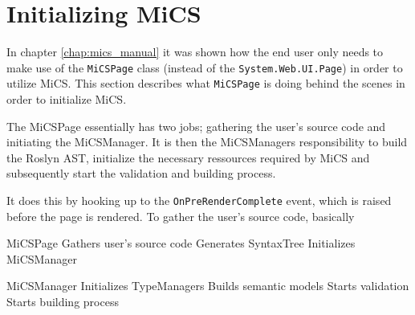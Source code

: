 \section{Initializing MiCS} %
\label{sec:initializing_mics}

In chapter \ref{chap:mics_manual} it was shown how the end user only needs to make use of the \texttt{MiCSPage} class (instead of the \texttt{System.Web.UI.Page}) in order to utilize MiCS. This section describes what \texttt{MiCSPage} is doing behind the scenes in order to initialize MiCS.

The MiCSPage essentially has two jobs; gathering the user's source code and initiating the MiCSManager. It is then the MiCSManagers responsibility to build the Roslyn AST, initialize the necessary ressources required by MiCS and subsequently start the validation and building process.

It does this by hooking up to the \texttt{OnPreRenderComplete} event, which is raised before the page is rendered. To gather the user's source code, basically 



MiCSPage
	Gathers user's source code
	Generates SyntaxTree
	Initializes MiCSManager

MiCSManager
	Initializes TypeManagers
		Builds semantic models
	Starts validation
	Starts building process






















